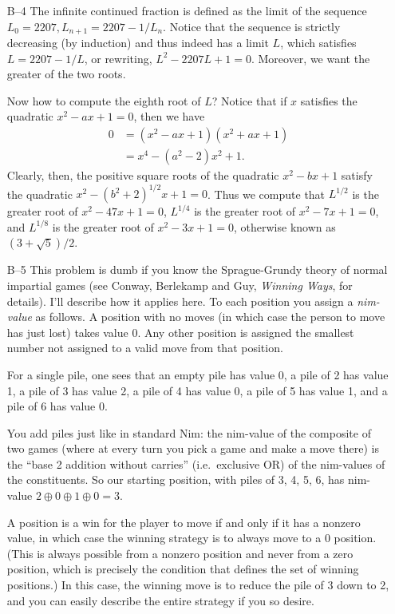 \documentclass[amssymb,twocolumn,pra,10pt,aps]{revtex4-1}
\begin{document}
\begin{itemize}
\item[B--4]
The infinite continued fraction is defined as the limit of the
sequence $L_{0} = 2207, L_{n+1} = 2207-1/L_{n}$. Notice that the
sequence is strictly decreasing (by induction) and thus indeed has a
limit $L$, which satisfies $L = 2207 - 1/L$, or rewriting, $L^{2} -
2207L + 1 = 0$. Moreover, we want the greater of the two roots.

Now how to compute the eighth root of $L$? Notice that if $x$
satisfies the quadratic $x^{2} - ax + 1 = 0$, then we have
\begin{align*}
0 &= (x^{2} - ax + 1)(x^{2} + ax + 1) \\
&= x^{4} - (a^{2} - 2)x^{2} + 1.
\end{align*}
Clearly, then, the positive square roots of the quadratic $x^{2} -
bx + 1$ satisfy the quadratic $x^{2} - (b^{2}+2)^{1/2}x + 1 = 0$. Thus
we compute that $L^{1/2}$ is the greater root of $x^{2} - 47x + 1 =
0$, $L^{1/4}$ is the greater root of $x^{2} - 7x+ 1 =0$, and
$L^{1/8}$ is the greater root of $x^{2} - 3x + 1 = 0$, otherwise
known as $(3 + \sqrt{5})/2$.

\item[B--5]
This problem is dumb if you know the Sprague-Grundy theory of normal
impartial games (see Conway, Berlekamp and Guy, {\it Winning Ways},
for details). I'll describe how it applies here. To each position you
assign a {\em nim-value} as follows. A position with no moves (in
which case the person to move has just lost) takes value 0. Any other
position is assigned the smallest number not assigned to a valid move
from that position.

For a single pile, one sees that an empty pile has value 0, a pile of
2 has value 1, a pile of 3 has value 2, a pile of 4 has value 0, a
pile of 5 has value 1, and a pile of 6 has value 0.

You add piles just like in standard Nim: the nim-value of the
composite of two games (where at every turn you pick a game and make
a move there) is the ``base 2 addition without carries'' (i.e.\
exclusive OR) of the nim-values of the constituents. So our starting
position, with piles of 3, 4, 5, 6, has nim-value $2 \oplus 0 \oplus
1 \oplus 0 = 3$.

A position is a win for the player to move if and only if it has a
nonzero value, in which case the winning strategy is to always move to
a 0 position. (This is always possible from a nonzero position and
never from a zero position, which is precisely the condition that
defines the set of winning positions.) In this case, the winning move
is to reduce the pile of 3 down to 2, and you can easily describe the
entire strategy if you so desire.


\end{itemize}
\end{document}
